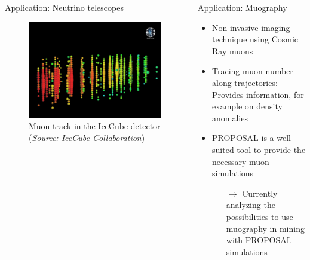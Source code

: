 \documentclass[t]{beamer}
\newlength{\thirdtextwidth}
\newlength{\itemseparation}
\begin{document}
\begin{columns}[onlytextwidth]
\begin{column}{\thirdtextwidth}
\begin{block}[equal height group=B]{Application: Neutrino telescopes}
        \begin{figure}
          \centering
          \includegraphics[width=0.7\linewidth, height=.4\textheight, keepaspectratio]{plots/icecube_muon.jpg}
          \caption*{Muon track in the IceCube detector \\(\emph{Source: IceCube Collaboration})}
        \end{figure}

      \end{block}
    \end{column}

    \begin{column}{\thirdtextwidth}%
      \begin{block}[equal height group=B]{Application: Muography}%
        \begin{itemize}
          \setlength\itemsep{\itemseparation}
          \item Non-invasive imaging technique using Cosmic Ray muons
          \item Tracing muon number along trajectories: Provides information, for example on density anomalies
          \item PROPOSAL is a well-suited tool to provide the necessary muon simulations
          \begin{itemize}
            \setlength\itemsep{\itemseparation}
            \item[$\rightarrow$] Currently analyzing the possibilities to use muography in mining with PROPOSAL simulations
          \end{itemize} 
        \end{itemize}
      \vspace{1.25em}
        \begin{figure}
            \begin{tikzpicture}[scale=2.5, every node/.style={scale=0.85}]
                \centering


\end{tikzpicture}
\end{figure}
\end{block}
\end{column}
\end{columns}
\end{document}
